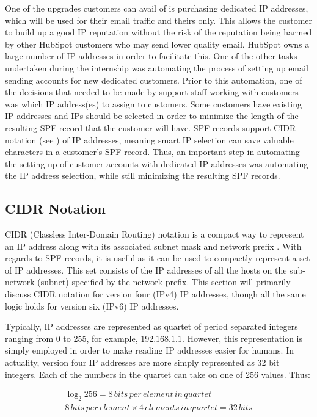 One of the upgrades customers can avail of is purchasing dedicated IP addresses, which will be used for their email traffic and theirs only. This allows the customer to build up a good IP reputation without the risk of the reputation being harmed by other HubSpot customers who may send lower quality email. HubSpot owns a large number of IP addresses in order to facilitate this. One of the other tasks undertaken during the internship was automating the process of setting up email sending accounts for new dedicated customers. Prior to this automation, one of the decisions that needed to be made by support staff working with customers was which IP address(es) to assign to customers. Some customers have existing IP addresses and IPs should be selected in order to minimize the length of the resulting SPF record that the customer will have. SPF records support CIDR notation (see ) of IP addresses, meaning smart IP selection can save valuable characters in a customer's SPF record. Thus, an important step in automating the setting up of customer accounts with dedicated IP addresses was automating the IP address selection, while still minimizing the resulting SPF records.

\subsection{CIDR Notation} \label{sec:CIDR}
CIDR (Classless Inter-Domain Routing) notation is a compact way to represent an IP address along with its associated subnet mask and network prefix \cite{cidr}. With regards to SPF records, it is useful as it can be used to compactly represent a set of IP addresses. This set consists of the IP addresses of all the hosts on the sub-network (subnet) specified by the network prefix. This section will primarily discuss CIDR notation for version four (IPv4) IP addresses, though all the same logic holds for version six (IPv6) IP addresses. 

Typically, IP addresses are represented as quartet of period separated integers ranging from 0 to 255, for example, $192.168.1.1$. However, this representation is simply employed in order to make reading IP addresses easier for humans. In actuality, version four IP addresses are more simply represented as 32 bit integers. Each of the numbers in the quartet can take on one of 256 values. Thus:

\begin{equation}
\begin{split}
\log_2 256 = 8\,bits\,per\,element\,in\,quartet \\
8\,bits\,per\,element \times 4\,elements\,in\,quartet = 32\, bits
\end{split}
\end{equation}




